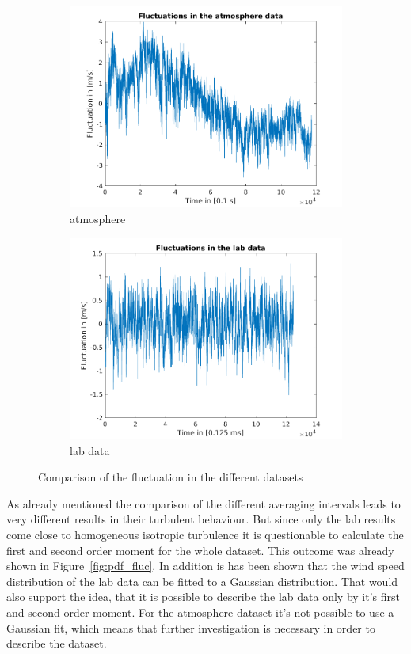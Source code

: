 \documentclass[12pt]{article}
\begin{document}
\begin{figure}[H]
\begin{subfigure}{0.5\textwidth}
  \centering
  \includegraphics[width=1\linewidth]{figures/fluc_atmosphere.png}
  \caption{atmosphere}
\end{subfigure}
\begin{subfigure}{0.5\textwidth}
  \centering
  \includegraphics[width=1\linewidth]{figures/fluc_center.png}
  \caption{lab data}
\end{subfigure}
\caption{Comparison of the fluctuation in the different datasets}
\label{fig:comparison_fluc}
\end{figure}

As already mentioned the comparison of the different averaging intervals leads to very different results in their turbulent behaviour. But since only the lab results come close to homogeneous isotropic turbulence it is questionable to calculate the first and second order moment for the whole dataset. This outcome was already shown in Figure~\ref{fig:pdf_fluc}. In addition is has been shown that the wind speed distribution of the lab data can be fitted to a Gaussian distribution. That would also support the idea, that it is possible to describe the lab data only by it's first and second order moment. For the atmosphere dataset it's not possible to use a Gaussian fit, which means that further investigation is necessary in order to describe the dataset.
\end{document}
